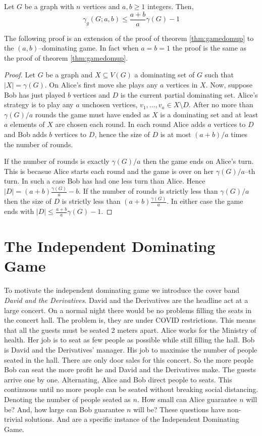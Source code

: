 \begin{theorem}[Askes] 
    Let $G$ be a graph with $n$ vertices and $a,b\geq1$ integers. Then,
    \[\gamma_{g}(G;a,b) \leq \frac{a+b}{a}\gamma(G) - 1\]
\end{theorem}
    The following proof is an extension of the proof of theorem \ref{thm:gamedomup} to the $(a,b)$--dominating game. In fact when $a=b=1$ the proof is the same as the proof of theorem \ref{thm:gamedomup}.
\begin{proof}    
   Let $G$ be a graph and $X\subseteq V(G)$ a dominating set of $G$ such that $|X| = \gamma(G)$. On Alice's first move she plays any $a$ vertices in $X$. Now, suppose Bob has just played $b$ vertices and $D$ is the current partial dominating set. Alice's strategy is to play any $a$ unchosen vertices, $v_1,\dots,v_a \in X\setminus D$. After no more than $\gamma(G)/a$ rounds the game must have ended as $X$ is a dominating set and at least $a$ elements of $X$ are chosen each round. In each round Alice adds $a$ vertices to $D$ and Bob adds $b$ vertices to $D$, hence the size of $D$ is at most $(a+b)/a$ times the number of rounds. 
   
   If the number of rounds is exactly $\gamma(G)/a$ then the game ends on Alice's turn. This is becasue Alice starts each round and the game is over on her $\gamma(G)/a$--th turn. In such a case Bob has had one less turn than Alice. Hence $|D|=(a+b)\frac{\gamma(G)}{a} -b$. If the number of rounds is strictly less than $\gamma(G)/a$ then the size of $D$ is strictly less than $(a+b)\frac{\gamma(G)}{a}$. In either case the game ends with $|D| \leq \frac{a+b}{a}\gamma(G) - 1$.
\end{proof}

\section{The Independent Dominating Game} \label{sec:ind_dom_game}

To motivate the independent dominating game we introduce the cover band \textit{David and the Derivatives}. David and the Derivatives are the headline act at a large concert. On a normal night there would be no problems filling the seats in the concert hall. The problem is, they are under COVID restrictions. This means that all the guests must be seated 2 meters apart. Alice works for the Ministry of health. Her job is to seat as few people as possible while still filling the hall. Bob is David and the Derivatives' manager. His job to maximise the number of people seated in the hall. There are only door sales for this concert. So the more people Bob can seat the more profit he and David and the Derivatives make. The guests arrive one by one. Alternating, Alice and Bob direct people to seats. This continuous until no more people can be seated without breaking social distancing. Denoting the number of people seated as $n$. How small can Alice guarantee $n$ will be? And, how large can Bob guarantee $n$ will be? These questions have non-trivial solutions. And are a specific instance of the Independent Dominating Game.

